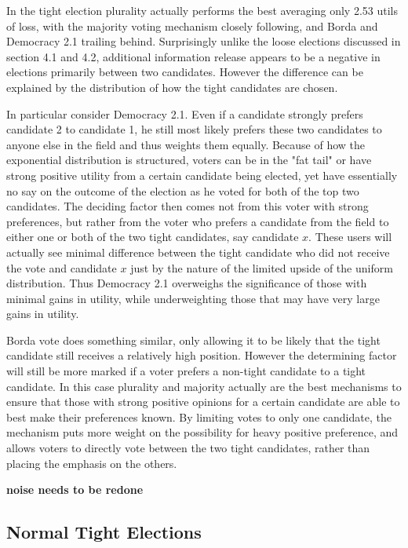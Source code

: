 \documentclass[11pt]{scrartcl}
\begin{document}
In the tight election plurality actually performs the best averaging only 2.53 utils of loss, with the majority voting mechanism closely following, and Borda and Democracy 2.1 trailing behind. Surprisingly unlike the loose elections discussed in section 4.1 and 4.2, additional information release appears to be a negative in elections primarily between two candidates. However the difference can be explained by the distribution of how the tight candidates are chosen.

In particular consider Democracy 2.1. Even if a candidate strongly prefers candidate 2 to candidate 1, he still most likely prefers these two candidates to anyone else in the field and thus weights them equally.  Because of how the exponential distribution is structured, voters can be in the "fat tail" or have strong positive utility from a certain candidate being elected, yet have essentially no say on the outcome of the election as he voted for both of the top two candidates. The deciding factor then comes not from this voter with strong preferences, but rather from the voter who prefers a candidate from the field to either one or both of the two tight candidates, say candidate $x$. These users will actually see minimal difference between the tight candidate who did not receive the vote and candidate $x$ just by the nature of the limited upside of the uniform distribution. Thus Democracy 2.1 overweighs the significance of those with minimal gains in utility, while underweighting those that may have very large gains in utility.

Borda vote does something similar, only allowing it to be likely that the tight candidate still receives a relatively high position. However the determining factor will still be more marked if a voter prefers a non-tight candidate to a tight candidate. In this case plurality and majority actually are the best mechanisms to ensure that those with strong positive opinions for a certain candidate are able to best make their preferences known. By limiting votes to only one candidate, the mechanism puts more weight on the possibility for heavy positive preference, and allows voters to directly vote between the two tight candidates, rather than placing the emphasis on the others.


\textbf{noise needs to be redone}


\subsection{Normal Tight Elections}
\end{document}
